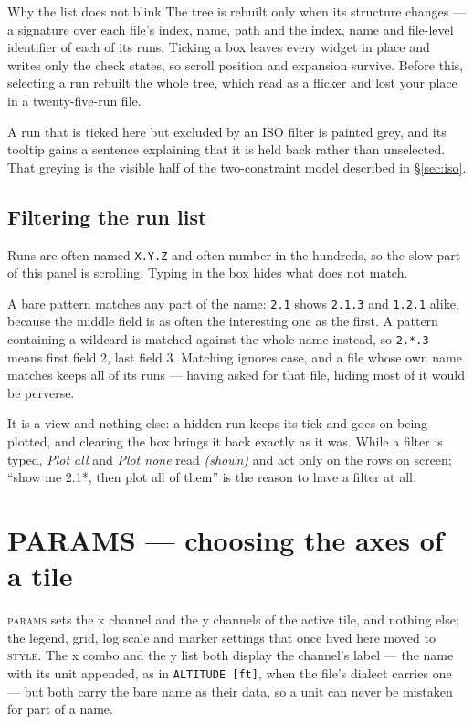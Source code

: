 \documentclass[11pt,a4paper,oneside]{report}
\newcommand{\code}[1]{\texttt{#1}}
\newcommand{\tab}[1]{\textsc{#1}}
\begin{document}
\begin{aoenote}{Why the list does not blink}
The tree is rebuilt only when its structure changes --- a signature over each
file's index, name, path and the index, name and file-level identifier of each of
its runs. Ticking a box leaves every widget in place and writes only the check
states, so scroll position and expansion survive. Before this, selecting a run
rebuilt the whole tree, which read as a flicker and lost your place in a
twenty-five-run file.
\end{aoenote}

A run that is ticked here but excluded by an ISO filter is painted grey, and its
tooltip gains a sentence explaining that it is held back rather than unselected.
That greying is the visible half of the two-constraint model described in
\S\ref{sec:iso}.

\subsection{Filtering the run list}


Runs are often named \code{X.Y.Z} and often number in the hundreds, so the slow
part of this panel is scrolling. Typing in the box hides what does not match.

A bare pattern matches any part of the name: \code{2.1} shows \code{2.1.3} and
\code{1.2.1} alike, because the middle field is as often the interesting one as
the first. A pattern containing a wildcard is matched against the whole name
instead, so \code{2.*.3} means first field 2, last field 3. Matching ignores
case, and a file whose own name matches keeps all of its runs --- having asked
for that file, hiding most of it would be perverse.

It is a view and nothing else: a hidden run keeps its tick and goes on being
plotted, and clearing the box brings it back exactly as it was. While a filter
is typed, \emph{Plot all} and \emph{Plot none} read \emph{(shown)} and act only
on the rows on screen; ``show me 2.1*, then plot all of them'' is the reason to
have a filter at all.

\section{PARAMS --- choosing the axes of a tile}
\label{sec:params}

\tab{params} sets the x channel and the y channels of the active tile, and
nothing else; the legend, grid, log scale and marker settings that once lived
here moved to \tab{style}. The x combo and the y list both display the channel's
label --- the name with its unit appended, as in \code{ALTITUDE [ft]}, when the
file's dialect carries one --- but both carry the bare name as their data, so a
unit can never be mistaken for part of a name.
\end{document}
